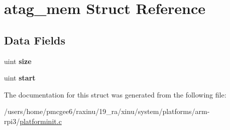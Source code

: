 \hypertarget{structatag__mem}{\section{atag\-\_\-mem Struct Reference}
\label{structatag__mem}
}
\subsection*{Data Fields}
\begin{DoxyCompactItemize}
\item 
\hypertarget{structatag__mem_afc1e9af240ced2094268923abcba858f}{uint {\bfseries size}}\label{structatag__mem_afc1e9af240ced2094268923abcba858f}

\item 
\hypertarget{structatag__mem_a7f5e8ec40d1a6f07a926dcfb06dbddf7}{uint {\bfseries start}}\label{structatag__mem_a7f5e8ec40d1a6f07a926dcfb06dbddf7}

\end{DoxyCompactItemize}


The documentation for this struct was generated from the following file\-:\begin{DoxyCompactItemize}
\item 
/users/home/pmcgee6/raxinu/19\-\_\-ra/xinu/system/platforms/arm-\/rpi3/\hyperlink{platforminit_8c}{platforminit.\-c}\end{DoxyCompactItemize}

